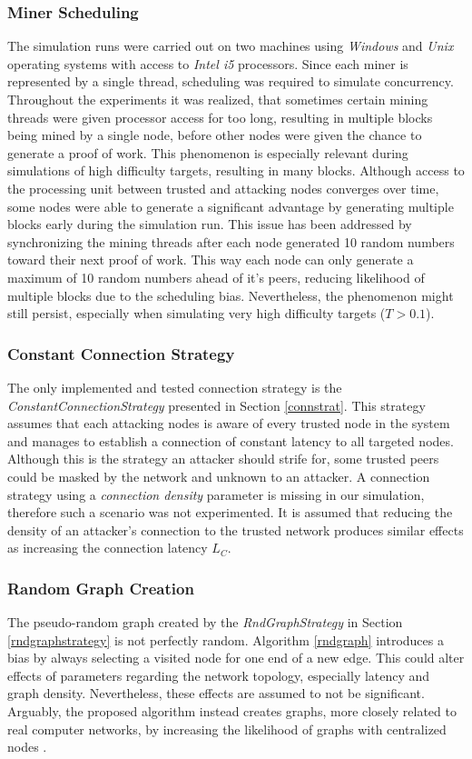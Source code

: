\documentclass[a4paper,12pt,twoside]{report}
\begin{document}
\subsubsection{Miner Scheduling}
The simulation runs were carried out on two machines using \textit{Windows} and \textit{Unix} operating systems with access to \textit{Intel i5} processors. Since each miner is represented by a single thread, scheduling was required to simulate concurrency. Throughout the experiments it was realized, that sometimes certain mining threads were given processor access for too long, resulting in multiple blocks being mined by a single node, before other nodes were given the chance to generate a proof of work. This phenomenon is especially relevant during simulations of high difficulty targets, resulting in many blocks. Although access to the processing unit between trusted and attacking nodes converges over time, some nodes were able to generate a significant advantage by generating multiple blocks early during the simulation run. This issue has been addressed by synchronizing the mining threads after each node generated 10 random numbers toward their next proof of work. This way each node can only generate a maximum of 10 random numbers ahead of it's peers, reducing likelihood of multiple blocks due to the scheduling bias. Nevertheless, the phenomenon might still persist, especially when simulating very high difficulty targets ($T > 0.1$).
\subsubsection{Constant Connection Strategy}
The only implemented and tested connection strategy is the \textit{ConstantConnectionStrategy} presented in Section \ref{connstrat}. This strategy assumes that each attacking nodes is aware of every trusted node in the system and manages to establish a connection of constant latency to all targeted nodes. Although this is the strategy an attacker should strife for, some trusted peers could be masked by the network and unknown to an attacker. A connection strategy using a \textit{connection density} parameter is missing in our simulation, therefore such a scenario was not experimented. It is assumed that reducing the density of an attacker's connection to the trusted network produces similar effects as increasing the connection latency $L_C$.
\subsubsection{Random Graph Creation}
The pseudo-random graph created by the \textit{RndGraphStrategy} in Section \ref{rndgraphstrategy} is not perfectly random. Algorithm \ref{rndgraph} introduces a bias by always selecting a visited node for one end of a new edge. This could alter effects of parameters regarding the network topology, especially latency and graph density. Nevertheless, these effects are assumed to not be significant. Arguably, the proposed algorithm instead creates graphs, more closely related to real computer networks, by increasing the likelihood of graphs with centralized nodes \cite{stackoverflow}.
\end{document}
